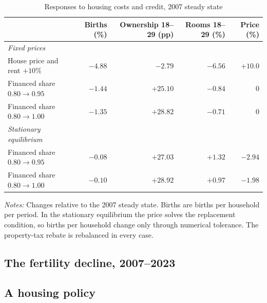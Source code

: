 \begin{table}[t]
\centering
\caption{Responses to housing costs and credit, 2007 steady state}
\label{tab:results-experiments}
\small
\begin{tabular}{lrrrr}
\toprule
 & Births (\%) & Ownership 18--29 (pp) & Rooms 18--29 (\%) & Price (\%) \\
\midrule
\emph{Fixed prices} & & & & \\
House price and rent $+10\%$ & $-4.88$ & $-2.79$ & $-6.56$ & $+10.0$ \\
Financed share $0.80\to0.95$ & $-1.44$ & $+25.10$ & $-0.84$ & 0 \\
Financed share $0.80\to1.00$ & $-1.35$ & $+28.82$ & $-0.71$ & 0 \\
\addlinespace
\emph{Stationary equilibrium} & & & & \\
Financed share $0.80\to0.95$ & $-0.08$ & $+27.03$ & $+1.32$ & $-2.94$ \\
Financed share $0.80\to1.00$ & $-0.10$ & $+28.92$ & $+0.97$ & $-1.98$ \\
\bottomrule
\end{tabular}
\par\smallskip
\begin{minipage}{0.92\linewidth}
\footnotesize\textit{Notes:} Changes relative to the 2007 steady state.
Births are births per household per period. In the stationary equilibrium the
price solves the replacement condition, so births per household change only
through numerical tolerance. The property-tax rebate is rebalanced in every
case.
\end{minipage}
\end{table}

\subsection{The fertility decline, 2007--2023}
\label{sec:results-transition}


\subsection{A housing policy}
\label{sec:results-policy}

